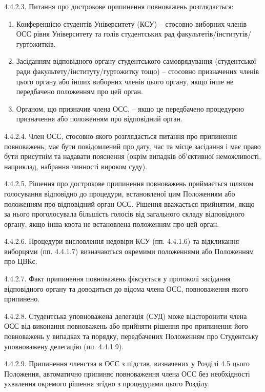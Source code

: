         4.4.2.3. Питання про дострокове припинення повноважень розглядається:

            \begin{enumerate}[label=\alph*)]
                \item Конференцією студентів Університету (КСУ) – стосовно виборних членів ОСС рівня Університету та голів студентських рад факультетів/інститутів/гуртожитків.
                \item Засіданням відповідного органу студентського самоврядування (студентської ради факультету/інституту/гуртожитку тощо) – стосовно призначених членів цього органу або інших виборних членів цього органу, якщо інше не передбачено положенням про цей орган.
                \item Органом, що призначив члена ОСС, – якщо це передбачено процедурою призначення або положенням про відповідний орган.
            \end{enumerate}

        4.4.2.4. Член ОСС, стосовно якого розглядається питання про припинення повноважень, має бути повідомлений про дату, час та місце засідання і має право бути присутнім та надавати пояснення (окрім випадків об'єктивної неможливості, наприклад, набрання чинності вироком суду).

        4.4.2.5. Рішення про дострокове припинення повноважень приймається шляхом голосування відповідно до процедури, встановленої цим Положенням або положенням про відповідний орган ОСС. Рішення вважається прийнятим, якщо за нього проголосувала більшість голосів від загального складу відповідного органу, якщо інша квота не встановлена положенням про цей орган.

        4.4.2.6. Процедури висловлення недовіри КСУ (пп. 4.4.1.6) та відкликання виборцями (пп. 4.4.1.7) визначаються окремими положеннями або Положенням про ЦВКс.

        4.4.2.7. Факт припинення повноважень фіксується у протоколі засідання відповідного органу та доводиться до відома члена ОСС, повноваження якого припинено.

        4.4.2.8. Студентська уповноважена делегація (СУД) може відсторонити члена ОСС від виконання повноважень або прийняти рішення про припинення його повноважень у випадках та порядку, передбачених Положенням про Студентську уповноважену делегацію (пп. 4.4.1.9).

        4.4.2.9. Припинення членства в ОСС з підстав, визначених у Розділі 4.5 цього Положення, автоматично припиняє повноваження члена ОСС без необхідності ухвалення окремого рішення згідно з процедурами цього Розділу.

